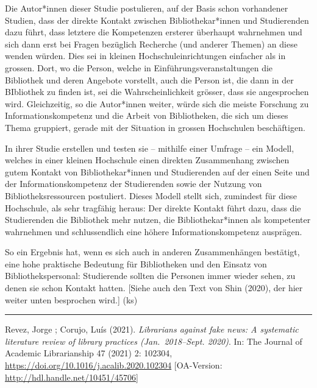 \documentclass[a4paper,
fontsize=11pt,
oneside,
numbers=noperiodatend,
parskip=half-,
bibliography=totoc,
final
]{scrartcl}
\begin{document}
Die Autor*innen dieser Studie postulieren, auf der Basis schon
vorhandener Studien, dass der direkte Kontakt zwischen
Bibliothekar*innen und Studierenden dazu führt, dass letztere die
Kompetenzen ersterer überhaupt wahrnehmen und sich dann erst bei Fragen
bezüglich Recherche (und anderer Themen) an diese wenden würden. Dies
sei in kleinen Hochschuleinrichtungen einfacher als in grossen. Dort, wo
die Person, welche in Einführungsveranstaltungen die Bibliothek und
deren Angebote vorstellt, auch die Person ist, die dann in der
BIbliothek zu finden ist, sei die Wahrscheinlichkeit grösser, dass sie
angesprochen wird. Gleichzeitig, so die Autor*innen weiter, würde sich
die meiste Forschung zu Informationskompetenz und die Arbeit von
Bibliotheken, die sich um dieses Thema gruppiert, gerade mit der
Situation in grossen Hochschulen beschäftigen.

In ihrer Studie erstellen und testen sie -- mithilfe einer Umfrage --
ein Modell, welches in einer kleinen Hochschule einen direkten
Zusammenhang zwischen gutem Kontakt von Bibliothekar*innen und
Studierenden auf der einen Seite und der Informationskompetenz der
Studierenden sowie der Nutzung von Bibliotheksressourcen postuliert.
Dieses Modell stellt sich, zumindest für diese Hochschule, als sehr
tragfähig heraus: Der direkte Kontakt führt dazu, dass die Studierenden
die Bibliothek mehr nutzen, die Bibliothekar*innen als kompetenter
wahrnehmen und schlussendlich eine höhere Informationskompetenz
ausprägen.

So ein Ergebnis hat, wenn es sich auch in anderen Zusammenhängen
bestätigt, eine hohe praktische Bedeutung für Bibliotheken und den
Einsatz von Bibliothekspersonal: Studierende sollten die Personen immer
wieder sehen, zu denen sie schon Kontakt hatten. {[}Siehe auch den Text
von Shin (2020), der hier weiter unten besprochen wird.{]} (ks)

\begin{center}\rule{0.5\linewidth}{0.5pt}\end{center}

Revez, Jorge ; Corujo, Luís (2021). \emph{Librarians against fake news:
A systematic literature review of library practices (Jan.~2018--Sept.
2020)}. In: The Journal of Academic Librarianship 47 (2021) 2: 102304,
\url{https://doi.org/10.1016/j.acalib.2020.102304} {[}OA-Version:
\url{http://hdl.handle.net/10451/45706}{]}
\end{document}
